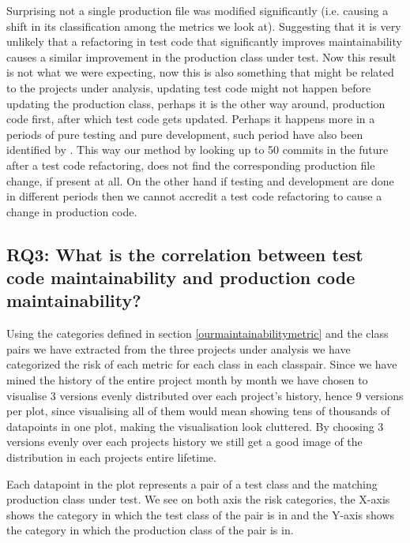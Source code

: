 Surprising not a single production file was modified significantly (i.e. causing a shift in its classification among the metrics we look at). Suggesting that it is very unlikely that a refactoring in test code that significantly improves maintainability causes a similar improvement in the production class under test. Now this result is not what we were expecting, now this is also something that might be related to the projects under analysis, updating test code might not happen before updating the production class, perhaps it is the other way around, production code first, after which test code gets updated. Perhaps it happens more in a periods of pure testing and pure development, such period have also been identified by \cite{zaidman2008mining}. This way our method by looking up to 50 commits in the future after a test code refactoring, does not find the corresponding production file change, if present at all. On the other hand if testing and development are done in different periods then we cannot accredit a test code refactoring to cause a change in production code.

\subsection{RQ3: What is the correlation between test code maintainability and production code maintainability?}\label{maintainability:correlation}
Using the categories defined in section \ref{ourmaintainabilitymetric} and the class pairs we have extracted from the three projects under analysis we have categorized the risk of each metric for each class in each classpair. Since we have mined the history of the entire project month by month we have chosen to visualise 3 versions evenly distributed over each project's history, hence 9 versions per plot, since visualising all of them would mean showing tens of thousands of datapoints in one plot, making the visualisation look cluttered. By choosing 3 versions evenly over each projects history we still get a good image of the distribution in each projects entire lifetime.

Each datapoint in the plot represents a pair of a test class and the matching production class under test. We see on both axis the risk categories, the X-axis shows the category in which the test class of the pair is in and the Y-axis shows the category in which the production class of the pair is in.

